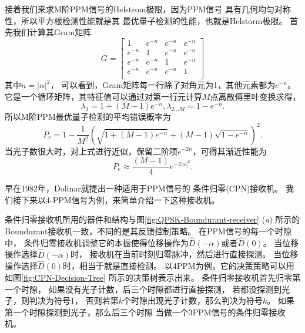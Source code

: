 接着我们来求M阶PPM信号的Helstrom极限，因为PPM信号
具有几何均匀对称性，所以平方根检测性能就是其
最优量子检测的性能，也就是Helstorm极限。
首先我们计算其Gram矩阵
\begin{equation}
G = \left[
\begin{array}{cccc}
 1 & e^{-n} & e^{-n} & e^{-n} \\
 e^{-n} & 1 & e^{-n} & e^{-n} \\
 e^{-n} & e^{-n} & 1 & e^{-n} \\
 e^{-n} & e^{-n} & e^{-n} & 1 \\
\end{array}
\right]
\end{equation}
其中$n=|\alpha|^2$，
可以看到，Gram矩阵每一行除了对角元为1，其他元素都为$e^{-n}$。
它是一个循环矩阵，其特征值可以通过对第一行元计算$M$点离散傅里叶变换求得\cite{zxd2004matrix}，
\begin{equation}
\lambda_1 = 1 + (M-1)e^{-n}, \lambda_{2...M} = 1-e^{-n}.
\end{equation}
所以M阶PPM最优量子检测的平均错误概率为
\begin{equation}
P_e = 1 - \frac{1}{M^2}(\sqrt{1 + (M-1)e^{-n}} + (M-1)\sqrt{1-e^{-n}})^2.
\end{equation}
当光子数很大时，对上式进行近似，保留二阶项$e^{-2n}$，可得其渐近性能为
\begin{equation}
P_e \approx \frac{(M-1)}{4} e^{-2|\alpha|^2}.
\label{eq:PPM-Hel-error}
\end{equation}

早在1982年，Dolinar就提出一种适用于PPM信号的
条件归零(CPN)接收机\cite{dolinar1982near}。
我们接下来以4-PPM信号为例，来简单介绍一下这种接收机。

条件归零接收机所用的器件和结构与图\ref{fig:QPSK-Boundurant-receiver} (\textit{a})
所示的Boundurant接收机一致，不同的是其反馈控制策略。
在PPM信号的每一个时隙中，
条件归零接收机调整它的本振使得位移操作为$\hat{D}(-\alpha)$或者$\hat{D}(0)$。
当位移操作选择$\hat{D}(-\alpha)$时，
接收机在当前时刻归零脉冲，然后进行直接探测。
当位移操作选择$\hat{D}(0)$时，相当于就是直接检测。
以4PPM为例，它的决策策略可以用如图\ref{fig:CPN-Decision-Tree}
所示的决策树表示出来。
条件归零接收机首先归零第一个时隙，
如果没有光子计数，后三个时隙都进行直接探测，
若都没探测到光子，则判决为符号1，
否则若第$k$个时隙出现光子计数，那么判决为符号$k$。
如果第一个时隙探测到光子，那么后三个时隙
当做一个3PPM信号的条件归零接收机。

